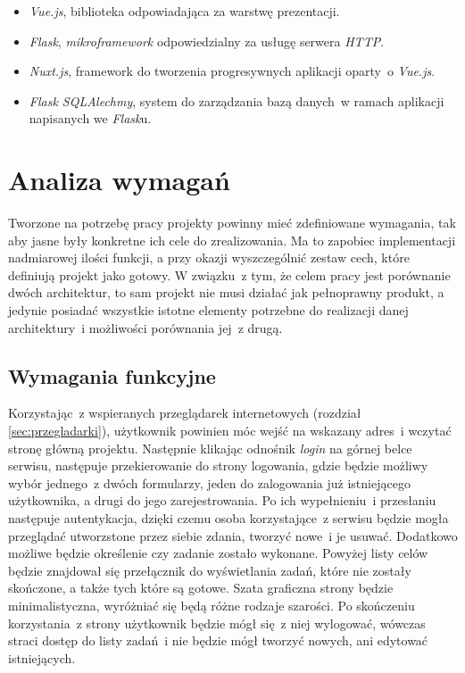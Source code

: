 \begin{itemize}
	\item \textit{Vue.js}\cite{vuejs}, biblioteka odpowiadająca za warstwę prezentacji.
	\item \textit{Flask}\cite{flask}, \textit{mikroframework} odpowiedzialny za usługę serwera \textit{HTTP}.
	\item \textit{Nuxt.js}\cite{nuxtjs}, framework do tworzenia progresywnych aplikacji oparty~o \textit{Vue.js}.
	\item \textit{Flask SQLAlechmy}\cite{flasksql}, system do zarządzania bazą danych~w ramach aplikacji napisanych we \textit{Flask}u. 
\end{itemize}


\section{Analiza wymagań}
Tworzone na potrzebę pracy projekty powinny mieć zdefiniowane wymagania, tak aby jasne były konkretne ich cele do zrealizowania. Ma to zapobiec implementacji nadmiarowej ilości funkcji, a przy okazji wyszczególnić zestaw cech, które definiują projekt jako gotowy. W związku~z tym, że celem pracy jest porównanie dwóch architektur, to sam projekt nie musi działać jak pełnoprawny produkt, a jedynie posiadać wszystkie istotne elementy potrzebne do realizacji danej architektury~i możliwości porównania jej~z drugą.

\subsection{Wymagania funkcyjne}
Korzystając~z wspieranych przeglądarek internetowych (rozdział \ref{sec:przegladarki}), użytkownik powinien móc wejść na wskazany adres~i wczytać stronę główną projektu. Następnie klikając odnośnik \textit{login} na górnej belce serwisu, następuje przekierowanie do strony logowania, gdzie będzie możliwy wybór jednego~z dwóch formularzy, jeden do zalogowania już istniejącego użytkownika, a drugi do jego zarejestrowania. Po ich wypełnieniu~i przesłaniu następuje autentykacja, dzięki czemu osoba korzystające~z serwisu będzie mogła przeglądać utworzstone przez siebie zdania, tworzyć nowe~i je usuwać. Dodatkowo możliwe będzie określenie czy zadanie zostało wykonane. Powyżej listy celów będzie znajdował się przełącznik do wyświetlania zadań, które nie zostały skończone, a także tych które są gotowe. Szata graficzna strony będzie minimalistyczna, wyróżniać się będą różne rodzaje szarości. Po skończeniu korzystania~z strony użytkownik będzie mógł się~z niej wylogować, wówczas straci dostęp do listy zadań~i nie będzie mógł tworzyć nowych, ani edytować istniejących.

